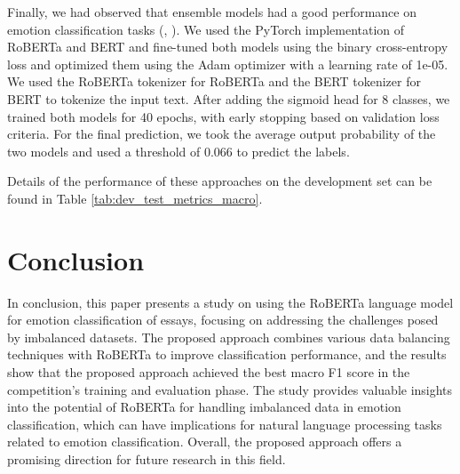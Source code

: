 \documentclass[11pt]{article}
\begin{document}
Finally, we had observed that ensemble models had a good performance on emotion classification tasks (\citet{maheshwari-varma-2022-ensemble}, \citet{Ganaie_2022}). We used the PyTorch implementation of RoBERTa and BERT and fine-tuned both models using the binary cross-entropy loss and optimized them using the Adam optimizer with a learning rate of 1e-05. We used the RoBERTa tokenizer for RoBERTa and the BERT tokenizer for BERT to tokenize the input text. After adding the sigmoid head for 8 classes, we trained both models for 40 epochs, with early stopping based on validation loss criteria. For the final prediction, we took the average output probability of the two models and used a threshold of 0.066 to predict the labels. 

Details of the performance of these approaches on the development set can be found in Table \ref{tab:dev_test_metrics_macro}.

\section{Conclusion}

In conclusion, this paper presents a study on using the RoBERTa language model for emotion classification of essays, focusing on addressing the challenges posed by imbalanced datasets. The proposed approach combines various data balancing techniques with RoBERTa to improve classification performance, and the results show that the proposed approach achieved the best macro F1 score in the competition's training and evaluation phase. The study provides valuable insights into the potential of RoBERTa for handling imbalanced data in emotion classification, which can have implications for natural language processing tasks related to emotion classification. Overall, the proposed approach offers a promising direction for future research in this field.

\nocite{buechel-etal-2018-modeling, codalab_competitions, barriere2023wassa, barriere2022wassa, tafreshi2021wassa, omitaomu2022empathic}



\end{document}
